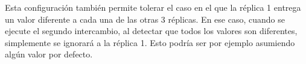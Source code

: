 

Esta configuración también permite tolerar el caso en el que la réplica 1 entrega un valor diferente a cada una de las otras 3 réplicas. En ese caso, cuando se ejecute el segundo intercambio, al detectar que todos los valores son diferentes, simplemente se ignorará a la réplica 1. Esto podría ser por ejemplo asumiendo algún valor por defecto.




